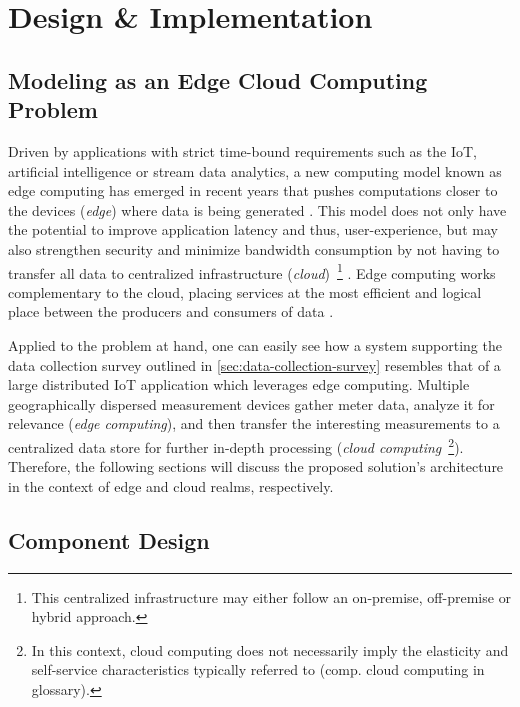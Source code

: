 

\chapter{Design \& Implementation}
\label{chp:architecture}

\section{Modeling as an Edge Cloud Computing Problem}
\label{sec:modeling-as-edge-cloud-problem}

Driven by applications with strict time-bound requirements such as the \ac*{IoT}, artificial intelligence or stream data analytics, a new computing model known as edge computing has emerged in recent years that pushes computations closer to the devices (\textit{edge}) where data is being generated \cite[p.~373]{xiong2018extend} \cite[p.~118]{alam2018orchestration}. This model does not only have the potential to improve application latency and thus, user-experience, but may also strengthen security and minimize bandwidth consumption by not having to transfer all data to centralized infrastructure (\textit{cloud})~\footnote{This centralized infrastructure may either follow an on-premise, off-premise or hybrid approach.} \cite[p.~295]{hoque2017towards}. Edge computing works complementary to the cloud, placing services at the most efficient and logical place between the producers and consumers of data \cite[p.~122]{alam2018orchestration}.

Applied to the problem at hand, one can easily see how a system supporting the data collection survey outlined in \autoref{sec:data-collection-survey} resembles that of a large distributed \acs*{IoT} application which leverages edge computing. Multiple geographically dispersed measurement devices gather meter data, analyze it for relevance (\textit{edge computing}), and then transfer the interesting measurements to a centralized data store for further in-depth processing (\textit{cloud computing}~\footnote{In this context, cloud computing does not necessarily imply the elasticity and self-service characteristics typically referred to (comp. \gls{cloud computing} in glossary).}). Therefore, the following sections will discuss the proposed solution's architecture in the context of edge and cloud realms, respectively.


\section{Component Design}
\label{sec:component-design}

